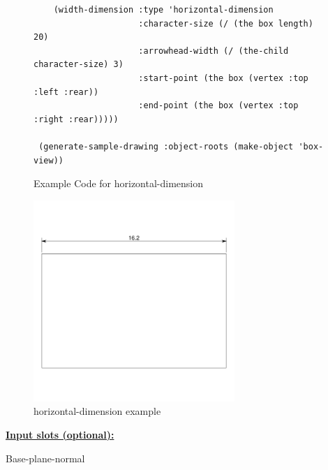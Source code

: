 \documentclass [11pt]{book}
\begin{document}
\begin{itemize}
\begin{figure}
\begin{lrbox}{\boxedverb}
\begin{minipage}{\linewidth}
{\begin{verbatim}
    (width-dimension :type 'horizontal-dimension
                     :character-size (/ (the box length) 20)
                     :arrowhead-width (/ (the-child character-size) 3)
                     :start-point (the box (vertex :top :left :rear))
                     :end-point (the box (vertex :top :right :rear)))))

 (generate-sample-drawing :object-roots (make-object 'box-view)) 
\end{verbatim}}
\end{minipage}
\end{lrbox}
\fbox{\usebox{\boxedverb}}

\caption{Example Code for horizontal-dimension}

\label{fig:example-code-horizontal-dimension}

\end{figure}

\begin{figure}
\begin{center}
\includegraphics[width=3in,height=3in]{../images/example-horizontal-dimension.pdf}
\end{center}

\caption{horizontal-dimension example}

\label{fig:horizontal-dimension}

\end{figure}





\textbf{
\underline{Input slots (optional):}}

\begin{description}

\item [Base-plane-normal]


\end{description}
\end{itemize}
\end{document}
